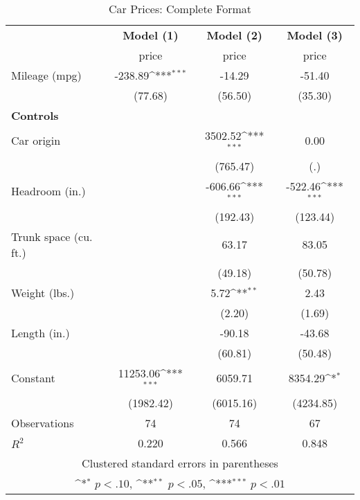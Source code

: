 \begin{table}[htbp]\centering
\def\sym#1{\ifmmode^{#1}\else\(^{#1}\)\fi}
\caption{Car Prices: Complete Format\label{reg_prices_5}}
\begin{tabular}{l*{3}{c}}
\toprule
                    &\multicolumn{1}{c}{\textbf{Model (1)}}&\multicolumn{1}{c}{\textbf{Model (2)}}&\multicolumn{1}{c}{\textbf{Model (3)}}\\
                    &       price         &       price         &       price         \\
\midrule
Mileage (mpg)       &     -238.89\sym{***}&      -14.29         &      -51.40         \\
                    &     (77.68)         &     (56.50)         &     (35.30)         \\
\textbf{Controls}   &                     &                     &                     \\
Car origin          &                     &     3502.52\sym{***}&        0.00         \\
                    &                     &    (765.47)         &         (.)         \\
Headroom (in.)      &                     &     -606.66\sym{***}&     -522.46\sym{***}\\
                    &                     &    (192.43)         &    (123.44)         \\
Trunk space (cu. ft.)&                     &       63.17         &       83.05         \\
                    &                     &     (49.18)         &     (50.78)         \\
Weight (lbs.)       &                     &        5.72\sym{**} &        2.43         \\
                    &                     &      (2.20)         &      (1.69)         \\
Length (in.)        &                     &      -90.18         &      -43.68         \\
                    &                     &     (60.81)         &     (50.48)         \\
Constant            &    11253.06\sym{***}&     6059.71         &     8354.29\sym{*}  \\
                    &   (1982.42)         &   (6015.16)         &   (4234.85)         \\
\midrule
Observations        &          74         &          74         &          67         \\
\(R^{2}\)           &       0.220         &       0.566         &       0.848         \\
\bottomrule
\multicolumn{4}{c}{\footnotesize Clustered standard errors in parentheses}\\
\multicolumn{4}{c}{\footnotesize \sym{*} \(p<.10\), \sym{**} \(p<.05\), \sym{***} \(p<.01\)}\\
\end{tabular}
\end{table}
